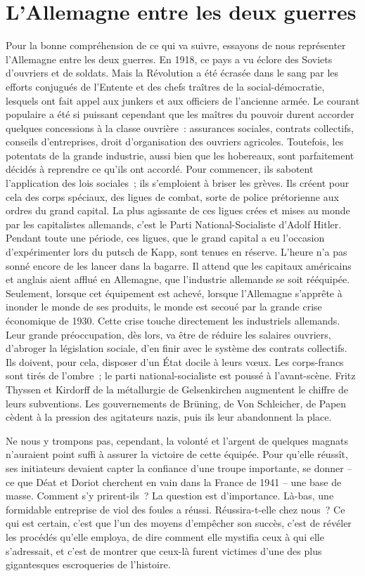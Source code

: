 \documentclass[french,twoside]{book} %
\begin{document}
\section[{L’Allemagne entre les deux guerres}]{L’Allemagne entre les deux guerres}
\noindent Pour la bonne compréhension de ce qui va suivre, essayons de nous représenter l’Allemagne entre les deux guerres. En 1918, ce pays a vu éclore des Soviets d’ouvriers et de soldats. Mais la Révolution a été écrasée dans le sang par les efforts conjugués de l’Entente et des chefs traîtres de la social-démocratie, lesquels ont fait appel aux junkers et aux officiers de l’ancienne armée. Le courant populaire a été si puissant cependant que les maîtres du pouvoir durent accorder quelques concessions à la classe ouvrière : assurances sociales, contrats collectifs, conseils d’entreprises, droit d’organisation des ouvriers agricoles. Toutefois, les potentats de la grande industrie, aussi bien que les hobereaux, sont parfaitement décidés à reprendre ce qu’ils ont accordé. Pour commencer, ils sabotent l’application des lois sociales ; ils s’emploient à briser les grèves. Ils créent pour cela des corps spéciaux, des ligues de combat, sorte de police prétorienne aux ordres du grand capital. La plus agissante de ces ligues crées et mises au monde par les capitalistes allemands, c’est le Parti National-Socialiste d’Adolf Hitler. Pendant toute une période, ces ligues, que le grand capital a eu l’occasion d’expérimenter lors du putsch de Kapp, sont tenues en réserve. L’heure n’a pas sonné encore de les lancer dans la bagarre. Il attend que les capitaux américains et anglais aient afflué en Allemagne, que l’industrie allemande se soit rééquipée. Seulement, lorsque cet équipement est achevé, lorsque l’Allemagne s’apprête à inonder le monde de ses produits, le monde est secoué par la grande crise économique de 1930. Cette crise touche directement les industriels allemands. Leur grande préoccupation, dès lors, va être de réduire les salaires ouvriers, d’abroger la législation sociale, d’en finir avec le système des contrats collectifs. Ils doivent, pour cela, disposer d’un État docile à leurs vœux. Les corps-francs sont tirés de l’ombre ; le parti national-socialiste est poussé à l’avant-scène. Fritz Thyssen et Kirdorff de la métallurgie de Gelsenkirchen augmentent le chiffre de leurs subventions. Les gouvernements de Brüning, de Von Schleicher, de Papen cèdent à la pression des agitateurs nazis, puis ils leur abandonnent la place.\par
Ne nous y trompons pas, cependant, la volonté et l’argent de quelques magnats n’auraient point suffi à assurer la victoire de cette équipée. Pour qu’elle réussît, ses initiateurs devaient capter la confiance d’une troupe importante, se donner – ce que Déat et Doriot cherchent en vain dans la France de 1941 – une base de masse. Comment s’y prirent-ils ? La question est d’importance. Là-bas, une formidable entreprise de viol des foules a réussi. Réussira-t-elle chez nous ? Ce qui est certain, c’est que l’un des moyens d’empêcher son succès, c’est de révéler les procédés qu’elle employa, de dire comment elle mystifia ceux à qui elle s’adressait, et c’est de montrer que ceux-là furent victimes d’une des plus gigantesques escroqueries de l’histoire.
\end{document}
